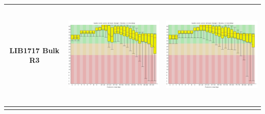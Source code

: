 \begin{center}
\begin{tabular}{ccc}
\begin{sideways}LIB1717 Bulk R3\end{sideways} & \includegraphics[height=5cm]{Appendices/images/Sample_LIB1717_base_quality_R1.png} & \includegraphics[height=5cm]{Appendices/images/Sample_LIB1717_base_quality_R2.png} \\ \midrule  \\

\end{tabular}
\end{center}

